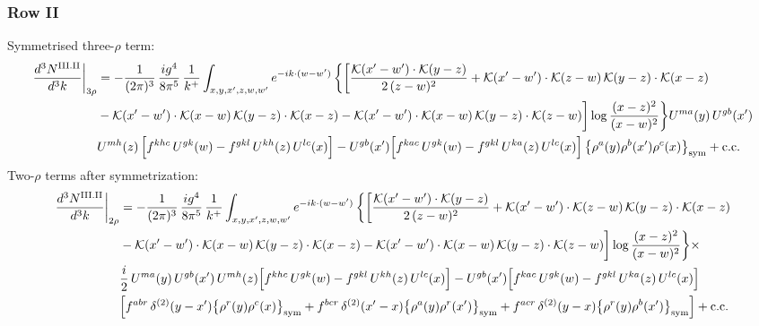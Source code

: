 \documentclass[9pt]{article}
\numberwithin{equation}{section}
\begin{document}
\subsubsection*{Row II}
Symmetrised three-$\rho$ term:
\begin{align}
\frac{d^{3}N^{\rm III.II}}{d^{3}k}\bigg|_{3\rho}&=-\frac{1}{(2\pi)^{3}}\,\frac{ig^{4}}{8\pi^{5}}\,\frac{1}{k^{+}}\int_{x,y,x',z,w,w'}e^{-ik\cdot{(w-w')}}\,\bigg\{\bigg[\frac{\mathcal{K}(x'-w')\cdot\mathcal{K}(y-z)}{2\,(z-w)^{2}}+\mathcal{K}(x'-w')\cdot\mathcal{K}(z-w)\,\mathcal{K}(y-z)\cdot\mathcal{K}(x-z)\notag\\
&-\mathcal{K}(x'-w')\cdot\mathcal{K}(x-w)\,\mathcal{K}(y-z)\cdot\mathcal{K}(x-z)-\mathcal{K}(x'-w')\cdot\mathcal{K}(x-w)\,\mathcal{K}(y-z)\cdot\mathcal{K}(z-w)\bigg]\log\frac{(x-z)^{2}}{(x-w)^{2}}\bigg\}U^{ma}(y)\,U^{gb}(x')\notag \\ & U^{mh}(z)\,\Big[f^{khc}\,U^{gk}(w)-f^{gkl}\,U^{kh}(z)\,U^{lc}(x)\Big]-U^{gb}(x')\Big[f^{kac}\,U^{gk}(w)-f^{gkl}\,U^{ka}(z)\,U^{lc}(x)\Big]\,\big\{\rho^{a}(y)\rho^{b}(x')\rho^{c}(x)\big\}_{\rm sym}+{\rm c.c.}\label{eq:D-III.II-3}
\end{align}
Two-$\rho$ terms after symmetrization:
\begin{align}
\frac{d^{3}N^{\rm III.II}}{d^{3}k}\bigg|_{2\rho}&=-\frac{1}{(2\pi)^{3}}\,\frac{ig^{4}}{8\pi^{5}}\,\frac{1}{k^{+}}\int_{x,y,x',z,w,w'}e^{-ik\cdot{(w-w')}}\,\bigg\{\bigg[\frac{\mathcal{K}(x'-w')\cdot\mathcal{K}(y-z)}{2\,(z-w)^{2}}+\mathcal{K}(x'-w')\cdot\mathcal{K}(z-w)\,\mathcal{K}(y-z)\cdot\mathcal{K}(x-z)\notag\\
&-\mathcal{K}(x'-w')\cdot\mathcal{K}(x-w)\,\mathcal{K}(y-z)\cdot\mathcal{K}(x-z)-\mathcal{K}(x'-w')\cdot\mathcal{K}(x-w)\,\mathcal{K}(y-z)\cdot\mathcal{K}(z-w)\bigg]\log\frac{(x-z)^{2}}{(x-w)^{2}}\bigg\}\times\,\notag\\
& \frac{i}{2}\,U^{ma}(y)\,U^{gb}(x')\,U^{mh}(z)\Big[f^{khc}\,U^{gk}(w)-f^{gkl}\,U^{kh}(z)\,U^{lc}(x)\Big]-U^{gb}(x')\Big[f^{kac}\,U^{gk}(w)-f^{gkl}\,U^{ka}(z)\,U^{lc}(x)\Big]\notag \\ & \Big[f^{abr}\,\delta^{(2)}(y-x')\big\{\rho^{r}(y)\rho^{c}(x)\big\}_{\rm sym} +f^{bcr}\,\delta^{(2)}(x'-x)\big\{\rho^{a}(y)\rho^{r}(x')\big\}_{\rm sym} +f^{acr}\,\delta^{(2)}(y-x)\big\{\rho^{r}(y)\rho^{b}(x')\big\}_{\rm sym}\Big]+{\rm c.c.}\label{eq:D-III.II-2}
\end{align}
\end{document}
